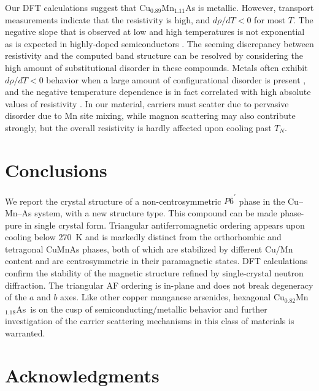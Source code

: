 \documentclass[10pt,doublespacing,edeposit]{uiucthesis2020}
\newcommand*{\cumnas}{Cu$_{0.82}$Mn$_{1.18}$As}
\begin{document}
\begin{mainmatter}
Our DFT calculations suggest that Cu$_{0.89}$Mn$_{1.11}$As is metallic. However, transport measurements indicate that the resistivity is high, and $d\rho/dT < 0$ for most $T$. 
The negative slope that is observed at low and high temperatures is not exponential as is expected in highly-doped semiconductors \cite{Chapman1963}.
The seeming discrepancy between resistivity and the computed band structure can be resolved by considering the high amount of substitutional disorder in these compounds.
Metals often exhibit $d\rho/dT < 0$ behavior when a large amount of configurational disorder is present \cite{Elk1979}, and the negative temperature dependence is in fact correlated with high absolute values of resistivity \cite{Mooij1973}.
In our material, carriers must scatter due to pervasive disorder due to Mn site mixing, while magnon scattering may also contribute strongly, but the overall resistivity is hardly affected upon cooling past $T_N$.

\section{Conclusions}

We report the crystal structure of a non-centrosymmetric $P\overline{6}^\prime$ phase in the Cu--Mn--As system, with a new structure type. This compound can be made phase-pure in single crystal form. Triangular antiferromagnetic ordering appears upon cooling below 270~K and is markedly distinct from the orthorhombic and tetragonal CuMnAs phases, both of which are stabilized by different Cu/Mn content and are centrosymmetric in their paramagnetic states. DFT calculations confirm the stability of the magnetic structure refined by single-crystal neutron diffraction. The triangular AF ordering is in-plane and does not break degeneracy of the $a$ and $b$ axes.  Like other copper manganese arsenides, hexagonal \cumnas\ is on the cusp of semiconducting/metallic behavior and further investigation of the carrier scattering mechanisms in this class of materials is warranted.


\section{Acknowledgments}


\end{mainmatter}
\end{document}
